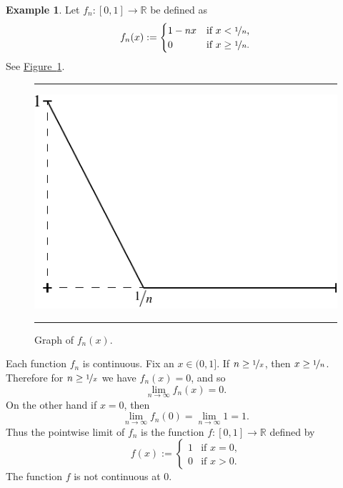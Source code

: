 \documentclass[12pt]{book}
\newenvironment{myfigureht}{%
\begin{figure}[h!t]
\noindent\rule{\textwidth}{0.4pt}\vspace{12pt}\par\centering}%
{\par\noindent\rule{\textwidth}{0.4pt}
\end{figure}}
\newcommand{\R}{{\mathbb{R}}}
\theoremstyle{plain}
\theoremstyle{remark}
\theoremstyle{definition}
\theoremstyle{exercise}
\theoremstyle{example}
\newtheorem{example}[thm]{Example}
\newcommand{\figureref}[1]{\hyperref[#1]{Figure~\ref*{#1}}}
\begin{document}
\begin{example}
Let $f_n \colon [0,1] \to \R$
be defined as
\begin{equation*}
f_n(x) :=
\begin{cases}
1-nx &  \text{if $x < \nicefrac{1}{n}$,}\\
0 &  \text{if $x \geq \nicefrac{1}{n}$.}
\end{cases}
\end{equation*}
See \figureref{contconvcntr:fig}.

\begin{myfigureht}
\includegraphics{figures/contconvcntr}
\caption{Graph of $f_n(x)$.%
\label{contconvcntr:fig}}
\end{myfigureht}

Each function $f_n$ is continuous.
Fix an $x \in (0,1]$.  If $n \geq \nicefrac{1}{x}$,
then $x \geq \nicefrac{1}{n}$.  Therefore for $n \geq \nicefrac{1}{x}$
we have $f_n(x) = 0$, and so
\begin{equation*}
\lim_{n \to \infty} f_n(x) = 0.
\end{equation*}
On the other hand if $x=0$, then
\begin{equation*}
\lim_{n \to \infty} f_n(0) = 
\lim_{n \to \infty} 1 = 1.
\end{equation*}
Thus the pointwise limit of $f_n$ is the function
$f \colon [0,1] \to \R$ defined by
\begin{equation*}
f(x) :=
\begin{cases}
1 &  \text{if $x = 0$,}\\
0 &  \text{if $x > 0$.}
\end{cases}
\end{equation*}
The function $f$ is not continuous at 0.
\end{example}
\end{document}
